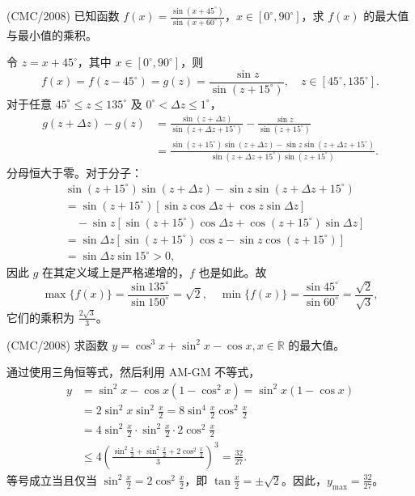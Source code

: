 \begin{questions}
\question (CMC/2008) 已知函数 $f(x) = \frac{\sin(x + 45^\circ)}{\sin(x + 60^\circ)}$，$x \in [0^\circ, 90^\circ]$，求 $f(x)$ 的最大值与最小值的乘积。
\begin{solution}
令 $z = x + 45^\circ$，其中 $x \in [0^\circ, 90^\circ]$，则
\[
f(x) = f(z - 45^\circ) = g(z) = \frac{\sin z}{\sin(z + 15^\circ)}, \quad z \in [45^\circ, 135^\circ].
\]
对于任意 $45^\circ \le z \le 135^\circ$ 及 $0^\circ < \Delta z \le 1^\circ$，
\begin{align*}
g(z + \Delta z) - g(z) &= \frac{\sin(z + \Delta z)}{\sin(z + \Delta z + 15^\circ)} - \frac{\sin z}{\sin(z + 15^\circ)} \\
&= \frac{\sin(z + 15^\circ) \sin(z + \Delta z) - \sin z \sin(z + \Delta z + 15^\circ)}{\sin(z + \Delta z + 15^\circ) \sin(z + 15^\circ)}.
\end{align*}
分母恒大于零。对于分子：
\begin{align*}
&\sin(z + 15^\circ) \sin(z + \Delta z) - \sin z \sin(z + \Delta z + 15^\circ) \\
&= \sin(z + 15^\circ) \left[ \sin z \cos \Delta z + \cos z \sin \Delta z \right] \\
&\quad - \sin z \left[ \sin(z + 15^\circ) \cos \Delta z + \cos(z + 15^\circ) \sin \Delta z \right] \\
&= \sin \Delta z \left[ \sin(z + 15^\circ) \cos z - \sin z \cos(z + 15^\circ) \right] \\
&= \sin \Delta z \sin 15^\circ > 0,
\end{align*}
因此 $g$ 在其定义域上是严格递增的，$f$ 也是如此。故
\[
\max \{f(x)\} = \frac{\sin 135^\circ}{\sin 150^\circ} = \sqrt{2}, \quad \min \{f(x)\} = \frac{\sin 45^\circ}{\sin 60^\circ} = \frac{\sqrt{2}}{\sqrt{3}},
\]
它们的乘积为 $\frac{2\sqrt{3}}{3}$。
\end{solution}

\question (CMC/2008) 求函数 $y = \cos^3 x + \sin^2 x - \cos x, x \in \mathbb{R}$ 的最大值。
\begin{solution}
通过使用三角恒等式，然后利用 AM-GM 不等式，
\begin{align*}
y &= \sin^2 x - \cos x (1 - \cos^2 x) = \sin^2 x (1 - \cos x) \\
&= 2 \sin^2 x \sin^2 \frac{x}{2} = 8 \sin^4 \frac{x}{2} \cos^2 \frac{x}{2} \\
&= 4 \sin^2 \frac{x}{2} \cdot \sin^2 \frac{x}{2} \cdot 2 \cos^2 \frac{x}{2} \\
&\le 4 \left( \frac{\sin^2 \frac{x}{2} + \sin^2 \frac{x}{2} + 2 \cos^2 \frac{x}{2}}{3} \right)^3 = \frac{32}{27}.
\end{align*}
等号成立当且仅当 $\sin^2 \frac{x}{2} = 2 \cos^2 \frac{x}{2}$，即 $\tan \frac{x}{2} = \pm \sqrt{2}$。因此，$y_{\max} = \frac{32}{27}$。
\end{solution}


\end{questions}
